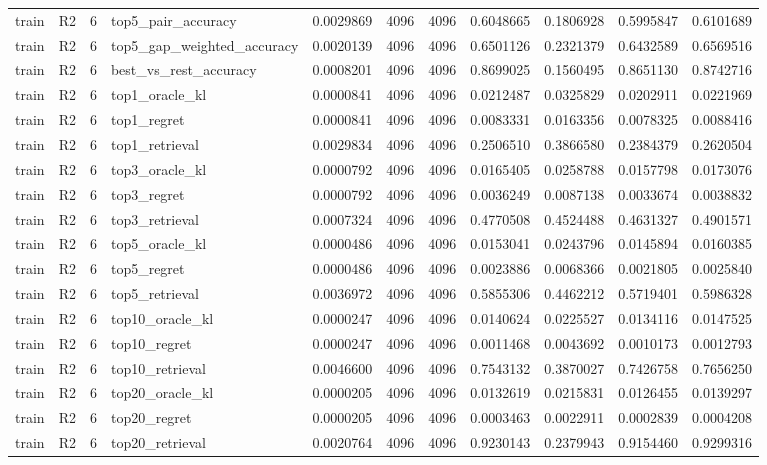 \begin{tabular}{llrlrrrrrrr}
train & R2 & 6 & top5_pair_accuracy & 0.0029869 & 4096 & 4096 & 0.6048665 & 0.1806928 & 0.5995847 & 0.6101689 \\
train & R2 & 6 & top5_gap_weighted_accuracy & 0.0020139 & 4096 & 4096 & 0.6501126 & 0.2321379 & 0.6432589 & 0.6569516 \\
train & R2 & 6 & best_vs_rest_accuracy & 0.0008201 & 4096 & 4096 & 0.8699025 & 0.1560495 & 0.8651130 & 0.8742716 \\
train & R2 & 6 & top1_oracle_kl & 0.0000841 & 4096 & 4096 & 0.0212487 & 0.0325829 & 0.0202911 & 0.0221969 \\
train & R2 & 6 & top1_regret & 0.0000841 & 4096 & 4096 & 0.0083331 & 0.0163356 & 0.0078325 & 0.0088416 \\
train & R2 & 6 & top1_retrieval & 0.0029834 & 4096 & 4096 & 0.2506510 & 0.3866580 & 0.2384379 & 0.2620504 \\
train & R2 & 6 & top3_oracle_kl & 0.0000792 & 4096 & 4096 & 0.0165405 & 0.0258788 & 0.0157798 & 0.0173076 \\
train & R2 & 6 & top3_regret & 0.0000792 & 4096 & 4096 & 0.0036249 & 0.0087138 & 0.0033674 & 0.0038832 \\
train & R2 & 6 & top3_retrieval & 0.0007324 & 4096 & 4096 & 0.4770508 & 0.4524488 & 0.4631327 & 0.4901571 \\
train & R2 & 6 & top5_oracle_kl & 0.0000486 & 4096 & 4096 & 0.0153041 & 0.0243796 & 0.0145894 & 0.0160385 \\
train & R2 & 6 & top5_regret & 0.0000486 & 4096 & 4096 & 0.0023886 & 0.0068366 & 0.0021805 & 0.0025840 \\
train & R2 & 6 & top5_retrieval & 0.0036972 & 4096 & 4096 & 0.5855306 & 0.4462212 & 0.5719401 & 0.5986328 \\
train & R2 & 6 & top10_oracle_kl & 0.0000247 & 4096 & 4096 & 0.0140624 & 0.0225527 & 0.0134116 & 0.0147525 \\
train & R2 & 6 & top10_regret & 0.0000247 & 4096 & 4096 & 0.0011468 & 0.0043692 & 0.0010173 & 0.0012793 \\
train & R2 & 6 & top10_retrieval & 0.0046600 & 4096 & 4096 & 0.7543132 & 0.3870027 & 0.7426758 & 0.7656250 \\
train & R2 & 6 & top20_oracle_kl & 0.0000205 & 4096 & 4096 & 0.0132619 & 0.0215831 & 0.0126455 & 0.0139297 \\
train & R2 & 6 & top20_regret & 0.0000205 & 4096 & 4096 & 0.0003463 & 0.0022911 & 0.0002839 & 0.0004208 \\
train & R2 & 6 & top20_retrieval & 0.0020764 & 4096 & 4096 & 0.9230143 & 0.2379943 & 0.9154460 & 0.9299316 \\

\end{tabular}
